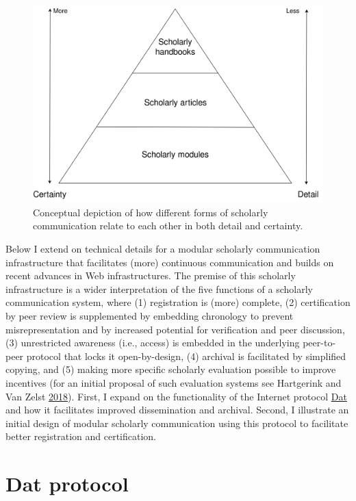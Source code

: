 \documentclass[a5paper]{book}
\begin{document}
\begin{figure}[h]

{\centering \includegraphics[width=0.8\linewidth]{assets/figures/datcom-fig1} 

}

\caption{Conceptual depiction of how different forms of scholarly communication relate to each other in both detail and certainty.}\label{fig:datcom-fig1}
\end{figure}

Below I extend on technical details for a modular scholarly
communication infrastructure that facilitates (more) continuous
communication and builds on recent advances in Web infrastructures. The
premise of this scholarly infrastructure is a wider interpretation of
the five functions of a scholarly communication system, where (1)
registration is (more) complete, (2) certification by peer review is
supplemented by embedding chronology to prevent misrepresentation and by
increased potential for verification and peer discussion, (3)
unrestricted awareness (i.e., access) is embedded in the underlying
peer-to-peer protocol that locks it open-by-design, (4) archival is
facilitated by simplified copying, and (5) making more specific
scholarly evaluation possible to improve incentives (for an initial
proposal of such evaluation systems see Hartgerink and Van Zelst
\protect\hyperlink{ref-doi:10.3390ux2fpublications6020021}{2018}).
First, I expand on the functionality of the Internet protocol
\href{https://datproject.org}{Dat} and how it facilitates improved
dissemination and archival. Second, I illustrate an initial design of
modular scholarly communication using this protocol to facilitate better
registration and certification.

\section{Dat protocol}\label{dat-protocol}
\end{document}
